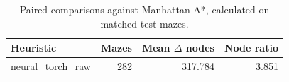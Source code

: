 \begin{table}[ht]
\centering
\small
\begin{tabular}{lrrr}
\toprule
Heuristic & Mazes & Mean $\Delta$ nodes & Node ratio \\
\midrule
neural\_torch\_raw & 282 & 317.784 & 3.851 \\
\bottomrule
\end{tabular}
\caption{Paired comparisons against Manhattan A*, calculated on matched test mazes.}
\label{tab:d3_paired}
\end{table}
